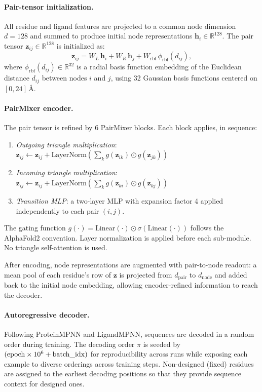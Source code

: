 \documentclass[11pt,letterpaper]{article}
\newcommand{\R}{\mathbb{R}}
\newcommand{\bz}{\mathbf{z}}
\newcommand{\bh}{\mathbf{h}}
\begin{document}
\paragraph{Pair-tensor initialization.}
All residue and ligand features are projected to a common node dimension $d{=}128$ and summed to
produce initial node representations $\bh_i \in \R^{128}$. The pair tensor $\bz_{ij} \in
\R^{128}$ is initialized as:
\begin{equation}
  \bz_{ij} = W_L\,\bh_i + W_R\,\bh_j + W_{\text{rbf}}\,\phi_{\text{rbf}}(d_{ij}),
\end{equation}
where $\phi_{\text{rbf}}(d_{ij}) \in \R^{32}$ is a radial basis function embedding of the
Euclidean distance $d_{ij}$ between nodes $i$ and $j$, using 32 Gaussian basis functions
centered on $[0, 24]$\,{\AA}.

\paragraph{PairMixer encoder.}
The pair tensor is refined by 6 PairMixer blocks. Each block applies, in sequence:
\begin{enumerate}
  \item \textit{Outgoing triangle multiplication}: $\bz_{ij} \leftarrow \bz_{ij} +
        \text{LayerNorm}\!\left(\sum_k g(\bz_{ik}) \odot g(\bz_{jk})\right)$
  \item \textit{Incoming triangle multiplication}: $\bz_{ij} \leftarrow \bz_{ij} +
        \text{LayerNorm}\!\left(\sum_k g(\bz_{ki}) \odot g(\bz_{kj})\right)$
  \item \textit{Transition MLP}: a two-layer MLP with expansion factor 4 applied
        independently to each pair $(i,j)$.
\end{enumerate}
The gating function $g(\cdot) = \text{Linear}(\cdot) \odot \sigma(\text{Linear}(\cdot))$ follows
the AlphaFold2 convention. Layer normalization is applied before each sub-module. No triangle
self-attention is used.

After encoding, node representations are augmented with pair-to-node readout: a mean pool of each
residue's row of $\bz$ is projected from $d_{\text{pair}}$ to $d_{\text{node}}$ and added back
to the initial node embedding, allowing encoder-refined information to reach the decoder.

\paragraph{Autoregressive decoder.}
Following ProteinMPNN and LigandMPNN, sequences are decoded in a random order during training. The
decoding order $\pi$ is seeded by $({\rm epoch} \times 10^6 + {\rm batch\_idx})$ for
reproducibility across runs while exposing each example to diverse orderings across training steps.
Non-designed (fixed) residues are assigned to the earliest decoding positions so that they provide
sequence context for designed ones.
\end{document}
